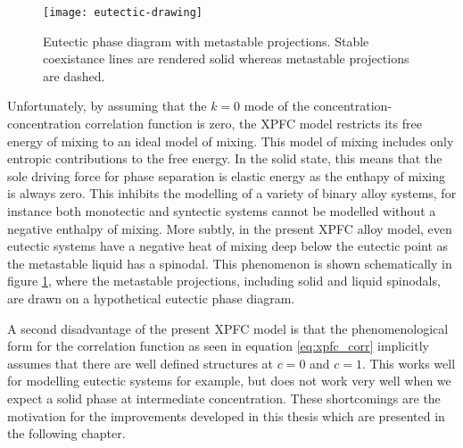 \begin{figure}
    \centering
    \texttt{[image: eutectic-drawing]}
    \caption[Eutectic Phase Diagram with Metastable Projections]{
        \label{fig:eutectic_drawing} Eutectic phase diagram with metastable
        projections. Stable coexistance lines are rendered solid whereas 
        metastable projections are dashed.
    }
\end{figure}

Unfortunately, by assuming that the $k=0$ mode of the
concentration-concentration correlation function is zero, the XPFC model
restricts its free energy of mixing to an ideal model of mixing. This model of
mixing includes only entropic contributions to the free energy. In the solid
state, this means that the sole driving force for phase separation is elastic
energy as the enthapy of mixing is always zero. This inhibits the modelling of a
variety of binary alloy systems, for instance both monotectic and syntectic
systems cannot be modelled without a negative enthalpy of mixing.  More subtly,
in the present XPFC alloy model, even eutectic systems have a negative heat of
mixing deep below the eutectic point as the metastable liquid has a spinodal.
This phenomenon is shown schematically in figure \ref{fig:eutectic_drawing},
where the metastable projections, including solid and liquid spinodals, are
drawn on a hypothetical eutectic phase diagram.

A second disadvantage of the present XPFC model is that the phenomenological
form for the correlation function as seen in equation \ref{eq:xpfc_corr}
implicitly assumes that there are well defined structures at $c=0$ and $c=1$.
This works well for modelling eutectic systems for example, but does not work
very well when we expect a solid phase at intermediate concentration. These
shortcomings are the motivation for the improvements developed in this thesis
which are presented in the following chapter.

